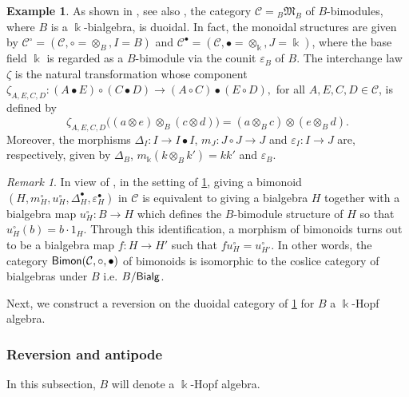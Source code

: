 \documentclass[nosumlimits,twoside]{amsart}
\theoremstyle{definition}
\newtheorem{example}[example]{\sc Example}
\theoremstyle{remark}
\newtheorem{remark}[remark]{\sc Remark}
\newcommand{\Cc}{\mathcal{C}}
\newcommand{\mm}{\mathfrak{M}}
\newcommand{\ot}{\otimes}
\def\Bialg{{\sf Bialg}}
\def\Bimon{{\sf Bimon}}
\begin{document}
\begin{example}
\label{es:bimod} As shown in \cite[Proposition 2.7]{BT25}, see also \cite[Remark 1.6]{Sar21}, the category $\mathcal{C}={}_B\mm_B$ of $B$-bimodules, where $B$ is a $\Bbbk$-bialgebra, is duoidal. In fact,  the monoidal structures are given by $\mathcal{C}^\circ=(\mathcal{C},  \circ =\otimes_B, I=B )$  and $\mathcal{C}^\bullet= (\mathcal{C}, \bullet=\otimes_\Bbbk, J=\Bbbk )$, where the base field $\Bbbk$ is regarded as a $B$-bimodule via the counit $\varepsilon_{B}$ of $B$. The interchange law $\zeta$ is the natural transformation whose component $\zeta_{A,E,C,D}:(A\bullet E)\circ (C\bullet D)\to (A\circ C)\bullet (E\circ D),$ for all $A,E,C,D\in\mathcal{C}$, is defined by
\[
\zeta_{A,E,C,D}\big((a\otimes e)\otimes_B (c\otimes d)\big)=(a\otimes_Bc)\otimes (e\otimes_B d).
\]
Moreover, the morphisms $\Delta_{I}:I\to I\bullet I$, $m_{J}:J\circ J\to J$ and $\varepsilon_{I}:I\to J$ are, respectively, given by $\Delta_{B}$, $m_{\Bbbk}(k\ot_{B}k')=kk'$ and $\varepsilon_{B}$.
\end{example}

\begin{remark}
\label{rmk:bimonbimod}
In view of  \cite[Corollary 2.10]{BT25}, in the setting of \cref{es:bimod},   giving a bimonoid $(H,m_H^\circ,u_H^\circ,\Delta_H^\bullet,\varepsilon_H^\bullet)$ in $\Cc$
is equivalent to giving a bialgebra $H$ together with a bialgebra map $u_{H}^{\circ}:B\rightarrow H$ which defines the $B$-bimodule
structure of $H$ so that $u_{H}^{\circ}\left(
b\right) =b\cdot 1_{H}.$
Through this identification, a morphism of bimonoids turns out to be a bialgebra map $f:H\to H'$ such that $fu_H^\circ=u_{H'}^\circ$.
In other words, the category  $\Bimon(\Cc,\circ,\bullet)$ of bimonoids is isomorphic to the coslice category of bialgebras under $B$ i.e. $B/\Bialg$.
\end{remark}

Next, we construct a reversion on the duoidal category of \cref{es:bimod} for $B$ a $\Bbbk$-Hopf algebra.

\subsubsection{Reversion and antipode}\label{subsec:reversionbim}
In this subsection, $B$ will denote a $\Bbbk$-Hopf algebra.
\end{document}
